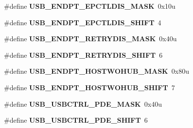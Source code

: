 \begin{DoxyCompactItemize}
\item 
\#define {\bfseries U\+S\+B\+\_\+\+E\+N\+D\+P\+T\+\_\+\+E\+P\+C\+T\+L\+D\+I\+S\+\_\+\+M\+A\+SK}~0x10u\hypertarget{group__USB__Register__Masks_ga07f43f2be7e974a763e86087f47e14d6}{}\label{group__USB__Register__Masks_ga07f43f2be7e974a763e86087f47e14d6}

\item 
\#define {\bfseries U\+S\+B\+\_\+\+E\+N\+D\+P\+T\+\_\+\+E\+P\+C\+T\+L\+D\+I\+S\+\_\+\+S\+H\+I\+FT}~4\hypertarget{group__USB__Register__Masks_ga0607b1ed419fd16c0c3635042ff33fd4}{}\label{group__USB__Register__Masks_ga0607b1ed419fd16c0c3635042ff33fd4}

\item 
\#define {\bfseries U\+S\+B\+\_\+\+E\+N\+D\+P\+T\+\_\+\+R\+E\+T\+R\+Y\+D\+I\+S\+\_\+\+M\+A\+SK}~0x40u\hypertarget{group__USB__Register__Masks_ga116b045c1163bccc05a270beb6ee2f3d}{}\label{group__USB__Register__Masks_ga116b045c1163bccc05a270beb6ee2f3d}

\item 
\#define {\bfseries U\+S\+B\+\_\+\+E\+N\+D\+P\+T\+\_\+\+R\+E\+T\+R\+Y\+D\+I\+S\+\_\+\+S\+H\+I\+FT}~6\hypertarget{group__USB__Register__Masks_ga7d07ae7b5369ee4cbfa19194ebc2e143}{}\label{group__USB__Register__Masks_ga7d07ae7b5369ee4cbfa19194ebc2e143}

\item 
\#define {\bfseries U\+S\+B\+\_\+\+E\+N\+D\+P\+T\+\_\+\+H\+O\+S\+T\+W\+O\+H\+U\+B\+\_\+\+M\+A\+SK}~0x80u\hypertarget{group__USB__Register__Masks_ga34644591d90c80611273ef5561529c34}{}\label{group__USB__Register__Masks_ga34644591d90c80611273ef5561529c34}

\item 
\#define {\bfseries U\+S\+B\+\_\+\+E\+N\+D\+P\+T\+\_\+\+H\+O\+S\+T\+W\+O\+H\+U\+B\+\_\+\+S\+H\+I\+FT}~7\hypertarget{group__USB__Register__Masks_ga3d502bcb3115f9bc7918b5fc67d42337}{}\label{group__USB__Register__Masks_ga3d502bcb3115f9bc7918b5fc67d42337}

\item 
\#define {\bfseries U\+S\+B\+\_\+\+U\+S\+B\+C\+T\+R\+L\+\_\+\+P\+D\+E\+\_\+\+M\+A\+SK}~0x40u\hypertarget{group__USB__Register__Masks_ga7fb8345a32022ec5df5129278d1aed30}{}\label{group__USB__Register__Masks_ga7fb8345a32022ec5df5129278d1aed30}

\item 
\#define {\bfseries U\+S\+B\+\_\+\+U\+S\+B\+C\+T\+R\+L\+\_\+\+P\+D\+E\+\_\+\+S\+H\+I\+FT}~6\hypertarget{group__USB__Register__Masks_gaaf556df66acd4f6ff2bc1f4fad1a05ed}{}\label{group__USB__Register__Masks_gaaf556df66acd4f6ff2bc1f4fad1a05ed}


\end{DoxyCompactItemize}
